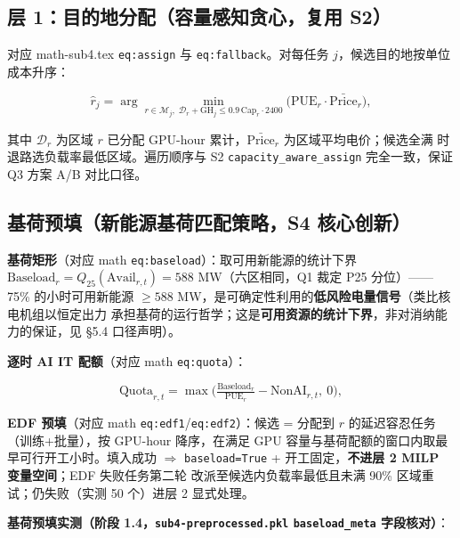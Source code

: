\documentclass{internal-report}
\begin{document}
\subsection{层 1：目的地分配（容量感知贪心，复用 S2）}
\label{sec:l1}

对应 math-sub4.tex \texttt{eq:assign} 与 \texttt{eq:fallback}。对每任务 $j$，候选目的地按单位成本升序：

\begin{equation}
  \hat{r}_j = \arg\min_{r \in \mathcal{M}_j,\; \mathcal{D}_r + \text{GH}_j \le 0.9\,\text{Cap}_r\cdot 2400}
  \big(\text{PUE}_r \cdot \bar{\text{Price}}_r\big),
  \label{eq:assign}
\end{equation}

其中 $\mathcal{D}_r$ 为区域 $r$ 已分配 GPU-hour 累计，$\bar{\text{Price}}_r$ 为区域平均电价；候选全满
时退路选负载率最低区域。遍历顺序与 S2 \texttt{capacity\_aware\_assign} 完全一致，保证 Q3 方案 A/B
对比口径。

\subsection{基荷预填（新能源基荷匹配策略，S4 核心创新）}
\label{sec:baseload}

\textbf{基荷矩形}（对应 math \texttt{eq:baseload}）：取可用新能源的统计下界
$\text{Baseload}_r = Q_{25}(\text{Avail}_{r,t}) = 588$ MW（六区相同，Q1 裁定 P25 分位）——75\%
的小时可用新能源 $\ge 588$ MW，是可确定性利用的\textbf{低风险电量信号}（类比核电机组以恒定出力
承担基荷的运行哲学；这是\textbf{可用资源的统计下界}，非对消纳能力的保证，见 §5.4 口径声明）。

\textbf{逐时 AI IT 配额}（对应 math \texttt{eq:quota}）：

\begin{equation}
  \text{Quota}_{r,t} = \max\Big( \tfrac{\text{Baseload}_r}{\text{PUE}_r} - \text{NonAI}_{r,t},\ 0 \Big),
  \label{eq:quota}
\end{equation}

\textbf{EDF 预填}（对应 math \texttt{eq:edf1}/\texttt{eq:edf2}）：候选 = 分配到 $r$ 的延迟容忍任务
（训练+批量），按 GPU-hour 降序，在满足 GPU 容量与基荷配额的窗口内取最早可行开工小时。填入成功
$\Rightarrow$ \texttt{baseload=True} + 开工固定，\textbf{不进层 2 MILP 变量空间}；EDF 失败任务第二轮
改派至候选内负载率最低且未满 90\% 区域重试；仍失败（实测 50 个）进层 2 显式处理。

\textbf{基荷预填实测（阶段 1.4，\texttt{sub4-preprocessed.pkl} \texttt{baseload\_meta} 字段核对）}：
\end{document}
